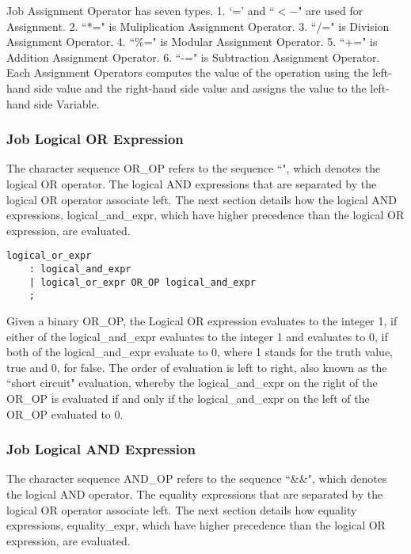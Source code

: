 \documentclass[prodmode,acmtecs]{acmsmall}
\begin{document}
Job Assignment Operator has seven types.  1. `=' and ``$<-$" are used
for Assignment.  2. ``*=" is Muliplication Assignment Operator.  3. 
``/=" is Division Assignment Operator.  4. ``\%=" is Modular Assignment
Operator.  5. ``+=" is Addition Assignment Operator.  6. ``-=" is
Subtraction Assignment Operator.  Each Assignment Operators computes
the value of the operation using the left-hand side value and the
right-hand side value and assigns the value to the left-hand side
Variable.



\subsubsection{Job Logical OR Expression}

The character sequence OR\_OP refers to the sequence ``\textbardbl", which  
denotes the logical OR operator. The logical AND expressions that are 
separated by the logical OR operator associate left. The next section 
details how the logical AND expressions, logical\_and\_expr, which have 
higher precedence than the logical OR expression, are evaluated. 

\begin{lstlisting}
logical_or_expr
	: logical_and_expr
	| logical_or_expr OR_OP logical_and_expr
	;
\end{lstlisting}

Given a binary OR\_OP, the Logical OR expression evaluates to the 
integer 1, if either of the logical\_and\_expr evaluates to the integer 
1 and evaluates to 0, if both of the logical\_and\_expr evaluate to 0, 
where 1 stands for the truth value, true and 0, for false. The order of 
evaluation is left to right, also known as the ``short circuit" 
evaluation, whereby the logical\_and\_expr on the right of the OR\_OP 
is evaluated if and only if the logical\_and\_expr on the left of the 
OR\_OP evaluated to 0. 

\subsubsection{Job Logical AND Expression}

The character sequence AND\_OP refers to the sequence ``\&\&", which 
denotes the logical AND operator. The equality expressions that are 
separated by the logical OR operator associate left. The next section 
details how equality expressions, equality\_expr, which have higher 
precedence than the logical OR expression, are evaluated. 
\end{document}
